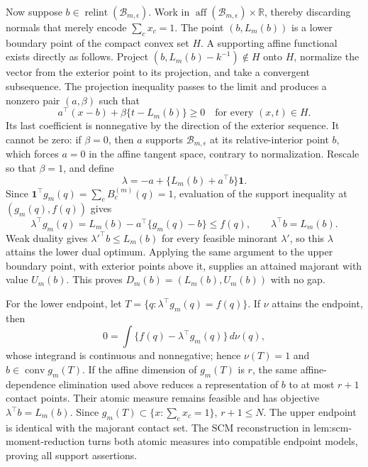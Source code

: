 Now suppose \(b\in\operatorname{relint}(\mathcal B_{m,\epsilon})\).  Work in \(\operatorname{aff}(\mathcal B_{m,\epsilon})\times\mathbb R\), thereby discarding normals that merely encode \(\sum_c x_c=1\).  The point \((b,L_m(b))\) is a lower boundary point of the compact convex set \(H\).  A supporting affine functional exists directly as follows.  Project \((b,L_m(b)-k^{-1})\notin H\) onto \(H\), normalize the vector from the exterior point to its projection, and take a convergent subsequence.  The projection inequality passes to the limit and produces a nonzero pair \((a,\beta)\) such that
\[
 a^{\top}(x-b)+\beta\{t-L_m(b)\}\geq0
 \quad\text{for every }(x,t)\in H.
\]
Its last coefficient is nonnegative by the direction of the exterior sequence.  It cannot be zero: if \(\beta=0\), then \(a\) supports \(\mathcal B_{m,\epsilon}\) at its relative-interior point \(b\), which forces \(a=0\) in the affine tangent space, contrary to normalization.  Rescale so that \(\beta=1\), and define
\[
 \lambda=-a+\{L_m(b)+a^{\top}b\}\mathbf 1.
\]
Since \(\mathbf1^{\top}g_m(q)=\sum_cB_c^{(m)}(q)=1\), evaluation of the support inequality at \((g_m(q),f(q))\) gives
\[
 \lambda^{\top}g_m(q)=L_m(b)-a^{\top}\{g_m(q)-b\}\leq f(q),
 \qquad \lambda^{\top}b=L_m(b).
\]
Weak duality gives \(\lambda'^{\top}b\leq L_m(b)\) for every feasible minorant \(\lambda'\), so this \(\lambda\) attains the lower dual optimum.  Applying the same argument to the upper boundary point, with exterior points above it, supplies an attained majorant with value \(U_m(b)\).  This proves \(D_m(b)=(L_m(b),U_m(b))\) with no gap.

For the lower endpoint, let \(T=\{q:\lambda^{\top}g_m(q)=f(q)\}\).  If \(\nu\) attains the endpoint, then
\[
 0=\int\{f(q)-\lambda^{\top}g_m(q)\}\,d\nu(q),
\]
whose integrand is continuous and nonnegative; hence \(\nu(T)=1\) and \(b\in\operatorname{conv}g_m(T)\).  If the affine dimension of \(g_m(T)\) is \(r\), the same affine-dependence elimination used above reduces a representation of \(b\) to at most \(r+1\) contact points.  Their atomic measure remains feasible and has objective \(\lambda^{\top}b=L_m(b)\).  Since \(g_m(T)\subset\{x:\sum_cx_c=1\}\), \(r+1\leq N\).  The upper endpoint is identical with the majorant contact set.  The SCM reconstruction in lem:scm-moment-reduction turns both atomic measures into compatible endpoint models, proving all support assertions.